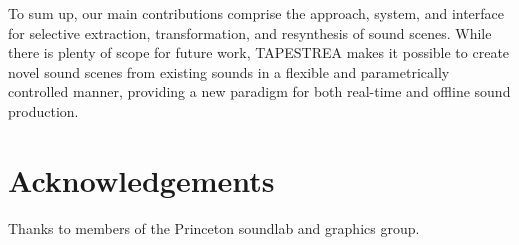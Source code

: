 \documentclass[a4paper]{article}
\begin{document}
To sum up, our main contributions comprise the approach, system, and interface for 
selective extraction, transformation, and resynthesis of sound scenes. While there is 
plenty of scope for future work, TAPESTREA makes it possible to create novel sound scenes 
from existing sounds in a flexible and parametrically controlled manner, providing a new paradigm 
for both real-time and offline sound production.

\section{Acknowledgements}
Thanks to members of the Princeton soundlab and graphics group. 


\end{document}
